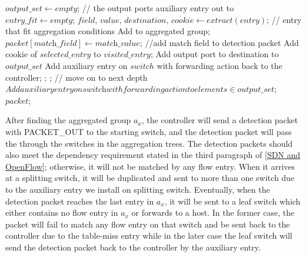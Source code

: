 \begin {tcolorbox}[blanker,float=tbp,
grow to left by=1cm, grow to right by=1cm]
\begin{algorithm}[H]
  \begin{algorithmic}[1]
      \State $\textit{output\_set} \gets empty$;  //  the output ports auxiliary entry out to
      \State $\textit{entry\_fit} \gets empty$;  
        \State $\textit{field, value, destination, cookie} \gets extract(\textit{entry})$;
          //  entry that fit aggregation conditions
          \State Add to aggregated group;
          \State $\textit{packet}[\textit{match\_field}] \gets \textit{match\_value}$;  //add match field to detection packet
          \State Add cookie of $selected\_entry$ to $visited\_entry$;
          \State Add output port to destination to $output\_set$
            \State Add auxiliary entry on $switch$ with forwarding action back to the controller;
            \State \Return;
          \Else
            \State {}; // move on to next depth
          \EndIf
        \EndIf
      \EndFor
        \State $Add auxiliary entry on \textit{switch} with forwarding action to elements \in 
        \textit{output\_set}$;
      \EndIf
      \State \Return  $packet$;
    \EndFunction
\end{algorithmic}
\end{algorithm}
\end{tcolorbox}

After finding the aggregated group $a_x$, the controller will send a detection packet with PACKET\_OUT to the starting switch, and the detection packet will pass the through the switches in the aggregation trees. The detection packets should also meet the dependency requirement stated in the third paragraph of \ref{SDN and OpenFlow}; otherwise, it will not be matched by any flow entry. When it arrives at a splitting switch, it will be duplicated and sent to more than one switch due to the auxiliary entry we install on splitting switch. Eventually, when the detection packet reaches the last entry in $a_x$, it will be sent to a leaf switch which either contains no flow entry in $a_x$ or forwards to a host. In the former case, the packet will fail to match any flow entry on that switch and be sent back to the controller due to the table-miss entry while in the later case the leaf switch will send the detection packet back to the controller by the auxiliary entry. 

